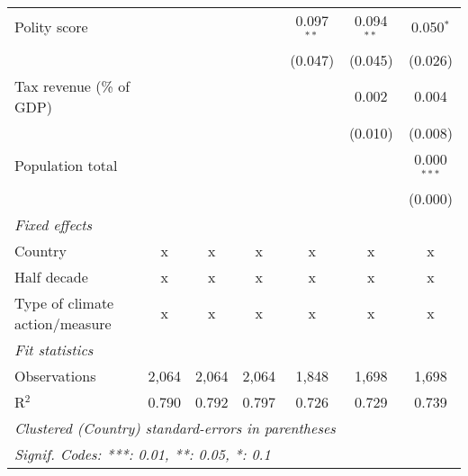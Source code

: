 \begin{tabular}{lcccccc}
   Polity score                                                        &              &         &                & 0.097$^{**}$  & 0.094$^{**}$  & 0.050$^{*}$\\   
                                                                       &              &         &                & (0.047)       & (0.045)       & (0.026)\\   
   Tax revenue (\% of GDP)                                             &              &         &                &               & 0.002         & 0.004\\   
                                                                       &              &         &                &               & (0.010)       & (0.008)\\   
   Population total                                                    &              &         &                &               &               & 0.000$^{***}$\\   
                                                                       &              &         &                &               &               & (0.000)\\   
   \emph{Fixed effects}\\
   Country                                                             & x            & x       & x              & x             & x             & x\\  
   Half decade                                                         & x            & x       & x              & x             & x             & x\\  
   Type of climate action/measure                                      & x            & x       & x              & x             & x             & x\\  
   \midrule \emph{Fit statistics}\\
   Observations                                                        & 2,064        & 2,064   & 2,064          & 1,848         & 1,698         & 1,698\\  
   R$^2$                                                               & 0.790        & 0.792   & 0.797          & 0.726         & 0.729         & 0.739\\  
   \midrule
   \multicolumn{7}{l}{\emph{Clustered (Country) standard-errors in parentheses}}\\
   \multicolumn{7}{l}{\emph{Signif. Codes: ***: 0.01, **: 0.05, *: 0.1}}\\
\end{tabular}
\par\endgroup


